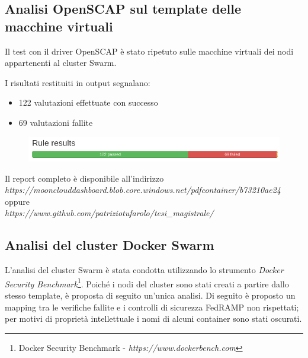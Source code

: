 \documentclass[../main.tex]{subfiles}
\begin{document}
\subsection{Analisi OpenSCAP sul template delle macchine virtuali}
Il test con il driver OpenSCAP è stato ripetuto sulle macchine virtuali dei nodi appartenenti al cluster Swarm.

I risultati restituiti in output segnalano:
\begin{itemize}
    \item 122 valutazioni effettuate con successo
    \item 69 valutazioni fallite
\end{itemize}
\begin{figure}[H]
    \centering
    \includegraphics[width=15cm]{immagini/test_oscap_2.png}
\end{figure}

Il report completo è disponibile all'indirizzo \\
\textit{https://moonclouddashboard.blob.core.windows.net/pdfcontainer/b73210ae24}    \\   
oppure \\
\textit{https://www.github.com/patriziotufarolo/tesi\_magistrale/} \\

\subsection{Analisi del cluster Docker Swarm}
\label{ref:dockerswarmanalysis}
L'analisi del cluster Swarm è stata condotta utilizzando lo strumento \textit{Docker Security Benchmark}\footnote{Docker Security Benchmark - \textit{https://www.dockerbench.com}}.
Poiché i nodi del cluster sono stati creati a partire dallo stesso template, è proposta di seguito un'unica analisi.
Di seguito è proposto un mapping tra le verifiche fallite e i controlli di sicurezza FedRAMP non rispettati; per motivi di proprietà intellettuale i nomi di alcuni container sono stati oscurati.
\end{document}
